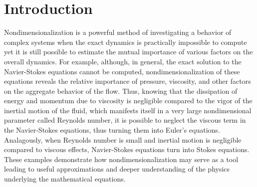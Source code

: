 \documentclass[oneside]{amsbook}
\theoremstyle{definition}
\theoremstyle{remark}
\numberwithin{section}{chapter}
\numberwithin{equation}{chapter}
\begin{document}
\maketitle


\setcounter{page}{4}
\setcounter{tocdepth}{2}

\tableofcontents

% 

\mainmatter

\chapter*{Introduction}

Nondimensionalization is a powerful method of investigating a behavior of complex systems when the exact dynamics is practically impossible to compute yet it is still possible to estimate the mutual importance of various factors on the overall dynamics. For example, although, in general, the exact solution to the Navier-Stokes equations cannot be computed, nondimensionalization of these equations reveals the relative importance of pressure, viscosity, and other factors on the aggregate behavior of the flow. Thus, knowing that the dissipation of energy and momentum due to viscosity is negligible compared to the vigor of the inertial motion of the fluid, which manifests itself in a very large nondimensional parameter called Reynolds number, it is possible to neglect the viscous term in the Navier-Stokes equations, thus turning them into Euler's equations. Analagously, when Reynolds number is small and inertial motion is negligible compared to viscous effects, Navier-Stokes equations turn into Stokes equations. These examples demonstrate how nondimensionalization may serve as a tool leading to useful approximations and deeper understanding of the physics underlying the mathematical equations.
\end{document}
